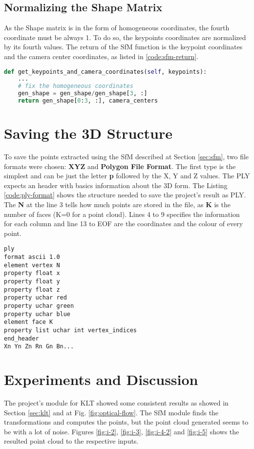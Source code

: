 \documentclass[]{IEEEtran}
\begin{document}
\subsection{Normalizing the Shape Matrix}
As the Shape matrix is in the form of homogeneous coordinates, the fourth coordinate must be always 1. To do so, the keypoints coordinates are normalized by its fourth values. The return of the SfM function is the keypoint coordinates and the camera center coordinates, as listed in \ref{code:sfm-return}.

\begin{lstlisting}[language=Python, caption={Return of SfM main function.}, label={code:sfm-return}]
def get_keypoints_and_camera_coordinates(self, keypoints):
    ...
    # fix the homogeneous coordinates
    gen_shape = gen_shape/gen_shape[3, :]
    return gen_shape[0:3, :], camera_centers
\end{lstlisting}

\section{Saving the 3D Structure}
To save the points extracted using the SfM described at Section \ref{sec:sfm}, two file formats were chosen: \textbf{XYZ} and \textbf{Polygon File Format}. The first type is the simplest and can be just the letter \textbf{p} followed by the X, Y and Z values.
The PLY expects an header with basics information about the 3D form. The Listing \ref{code:ply-format} shows the structure needed to save the project's result as PLY. The \textbf{N} at the line 3 tells how much points are stored in the file, as \textbf{K} is the number of faces (K=0 for a point cloud). Lines 4 to 9 specifies the information for each column and line 13 to EOF are the coordinates and the colour of every point.

\begin{lstlisting}[caption={PLY file format structure.}, label={code:ply-format}]
ply
format ascii 1.0
element vertex N
property float x
property float y
property float z
property uchar red
property uchar green
property uchar blue
element face K
property list uchar int vertex_indices
end_header
Xn Yn Zn Rn Gn Bn...
\end{lstlisting}


\section{Experiments and Discussion}

The project's module for KLT showed some consistent results as showed in Section \ref{sec:klt} and at Fig. \ref{fig:optical-flow}. The SfM module finds the transformations and computes the points, but the point cloud generated seems to be with a lot of noise. Figures \ref{fig:i-2}, \ref{fig:i-3}, \ref{fig:i-4-2} and \ref{fig:i-5} shows the resulted point cloud to the respective inputs.
\end{document}
